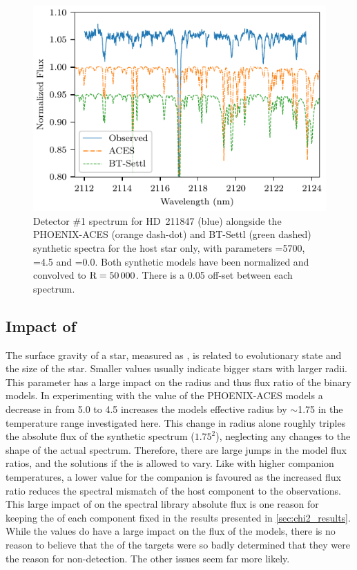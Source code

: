 \begin{figure}
    \centering
    \includegraphics[width=0.8\hsize]{figures/companion_recovery/HD211847_ACES_BTSettl.pdf}
    \caption[Spectrum of {HD~211847} compared to models.]{Detector \#1 spectrum for {HD~211847} (blue) alongside the {PHOENIX-ACES} (orange dash-dot) and {BT-Settl} (green dashed) synthetic spectra for the host star only, with parameters \Teff{}=5700\K{}, \Logg{}=4.5 and \feh{}=0.0.
        Both synthetic models have been normalized and convolved to \(\rm R=50\,000\).
        There is a 0.05 off-set between each spectrum.}
    \label{fig:hd211847-models}
\end{figure}

\subsection{Impact of \texorpdfstring{\Logg{}}{Logg}}
\label{subsec:logg}
The surface gravity of a star, measured as \Logg{}, is related to evolutionary state and the size of the star.
Smaller \Logg{} values usually indicate bigger stars with larger radii.
This parameter has a large impact on the radius and thus flux ratio of the binary models.
In experimenting with the \Logg{} value of the {PHOENIX-ACES} models a decrease in \Logg{} from 5.0 to 4.5 increases the models effective radius by \(\sim\)1.75 in the temperature range investigated here.
This change in radius alone roughly triples the absolute flux of the synthetic spectrum (\(1.75^2\)), neglecting any changes to the shape of the actual spectrum.
Therefore, there are large jumps in the model flux ratios, and the \textchisquared{} solutions if the \Logg{} is allowed to vary.
Like with higher companion temperatures, a lower \Logg{} value for the companion is favoured as the increased flux ratio reduces the spectral mismatch of the host component to the observations.
This large impact of \Logg{} on the spectral library absolute flux is one reason for keeping the \Logg{} of each component fixed in the \textchisquared{} results presented in \cref{sec:chi2_results}.
While the \Logg{} values do have a large impact on the flux of the models, there is no reason to believe that the \Logg{} of the targets were so badly determined that they were the reason for non-detection. The other issues seem far more likely.
 
